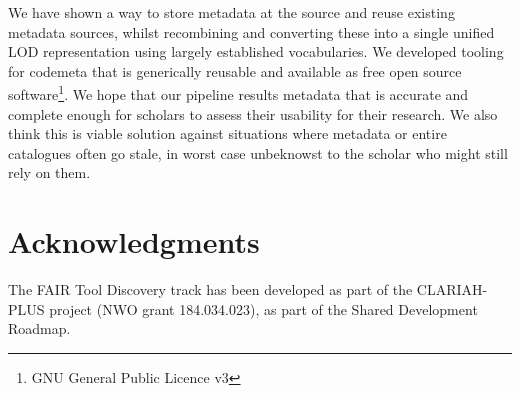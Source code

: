 \documentclass[a4paper,11pt]{article}
\begin{document}
We have shown a way to store metadata at the source and reuse existing metadata
sources, whilst recombining and converting these into a single unified LOD
representation using largely established vocabularies. We developed tooling for
codemeta that is generically reusable and available as free open source
software\footnote{GNU General Public Licence v3}. We hope that our pipeline
results metadata that is accurate and complete enough for scholars to assess
their usability for their research. We also think this is viable solution
against situations where metadata or entire catalogues often go stale, in worst
case unbeknowst to the scholar who might still rely on them.

\section*{Acknowledgments}

The FAIR Tool Discovery track has been developed as part of the CLARIAH-PLUS
project (NWO grant 184.034.023), as part of the Shared Development Roadmap.

\printbibliography
\end{document}

